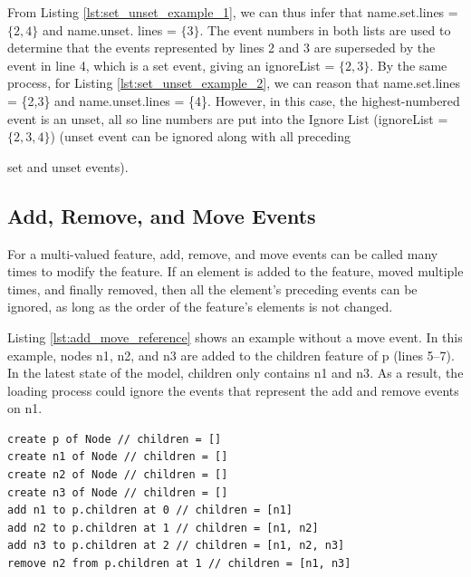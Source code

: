 From Listing \ref{lst:set_unset_example_1}, we can thus infer that \textsf{name}.\textsf{set}.\textsf{lines} = $\{2,4\}$ and \textsf{name}.\textsf{unset}. \textsf{lines} = $\{3\}$. The event numbers in both lists are used to determine that the events represented by lines 2 and 3 are superseded by the event in line 4, which is a \textsf{set} event, giving an \textsf{ignoreList} = $\{2, 3\}$. By the same process, for Listing \ref{lst:set_unset_example_2}, we can reason that \textsf{name}.\textsf{set}.\textsf{lines} = \{2,3\} and \textsf{name}.\textsf{unset}.\textsf{lines} = \{4\}. However, in this case, the highest-numbered event is an \textsf{unset}, all so line numbers are put into the Ignore List (\textsf{ignoreList} = $\{2, 3, 4\}$) (\textsf{unset} event can be ignored along with all preceding {\textsf{set} and \textsf{unset} events).
  
  \subsection{Add, Remove, and Move Events}\label{subsec:add_remove_and_move_operations}
  For a multi-valued feature, add, remove, and move events can be called many times to modify the feature. If an element is added to the feature, moved multiple times, and finally removed, then all the element’s preceding events can be ignored, as long as the order of the feature’s elements is not changed.
  
  Listing \ref{lst:add_move_reference} shows an example without a \textsf{move} event. In this example, nodes \textsf{n1}, \textsf{n2}, and \textsf{n3} are added to the \textsf{children} feature of \textsf{p} (lines 5–7). In the latest state of the model, \textsf{children} only contains \textsf{n1} and \textsf{n3}. As a result, the loading process could ignore the events that represent the \textsf{add} and \textsf{remove} events on \textsf{n1}.
  
\vspace{-20pt}
\begin{lstlisting}[style=eol,caption={A CBP of add and remove operations.},label=lst:add_move_reference]
create p of Node // children = []
create n1 of Node // children = []
create n2 of Node // children = []
create n3 of Node // children = []
add n1 to p.children at 0 // children = [n1]
add n2 to p.children at 1 // children = [n1, n2]
add n3 to p.children at 2 // children = [n1, n2, n3]
remove n2 from p.children at 1 // children = [n1, n3]
\end{lstlisting}

}
